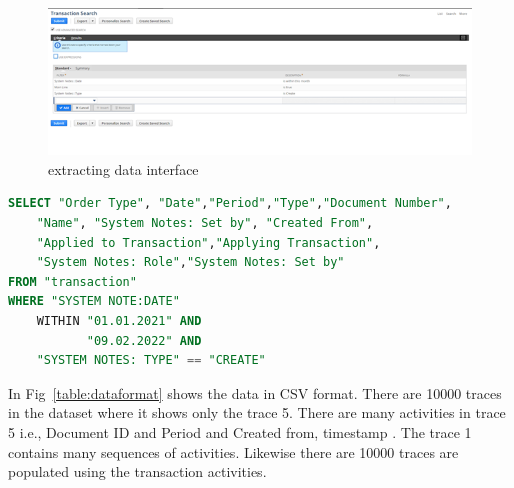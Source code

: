 \begin{figure}[!htb]
    \centering 
    \includegraphics[scale=0.7]{resource/data.png}
    \caption{extracting data interface}
    \label{figure:saveSearch}
\end{figure}



\begin{lstlisting}[language=SQL, caption={equal to SQL}, label={lst:sqlNetSuite} ]
SELECT "Order Type", "Date","Period","Type","Document Number",
    "Name", "System Notes: Set by", "Created From", 
    "Applied to Transaction","Applying Transaction", 
    "System Notes: Role","System Notes: Set by"  
FROM "transaction"
WHERE "SYSTEM NOTE:DATE" 
    WITHIN "01.01.2021" AND 
           "09.02.2022" AND 
    "SYSTEM NOTES: TYPE" == "CREATE"
\end{lstlisting}

In Fig~\ref{table:dataformat} shows the data in CSV format. There are 10000 traces in the dataset where it shows only the trace 5. There are many activities in trace 5 i.e., Document ID and Period and Created from, timestamp . The trace 1 contains many sequences of activities. Likewise there are 10000 traces are populated using the transaction activities.

